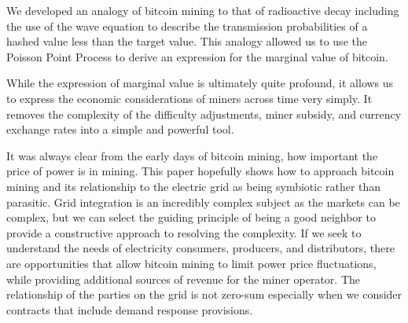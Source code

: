 \documentclass[runningheads]{llncs}
\begin{document}
We developed an analogy of bitcoin mining to that of radioactive decay including the use of the wave equation to describe the transmission probabilities of a hashed value less than the target value.
This analogy allowed us to use the Poisson Point Process to derive an expression for the marginal value of bitcoin.

While the expression of marginal value is ultimately quite profound, it allows us to express the economic considerations of miners across time very simply.
It removes the complexity of the difficulty adjustments, miner subsidy, and currency exchange rates into a simple and powerful tool.

It was always clear from the early days of bitcoin mining, how important the price of power is in mining.
This paper hopefully shows how to approach bitcoin mining and its relationship to the electric grid as being symbiotic rather than parasitic.
Grid integration is an incredibly complex subject as the markets can be complex, but we can select the guiding principle of being a good neighbor to provide a constructive approach to resolving the complexity.
If we seek to understand the needs of electricity consumers, producers, and distributors, there are opportunities that allow bitcoin mining to limit power price fluctuations, while providing additional sources of revenue for the miner operator.
The relationship of the parties on the grid is not zero-sum especially when we consider contracts that include demand response provisions. 


%
%


\end{document}
